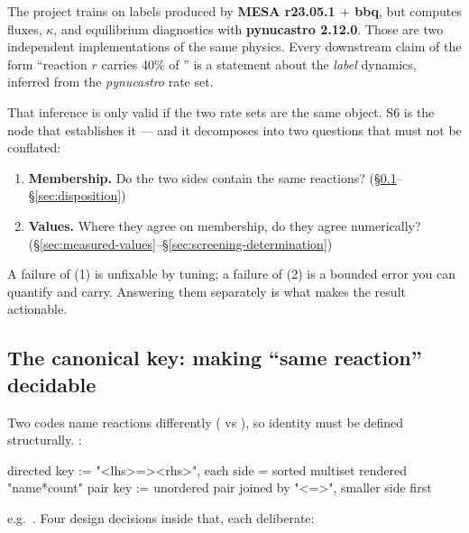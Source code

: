 The project trains on labels produced by \textbf{MESA r23.05.1 $+$ bbq}, but
computes fluxes, $\kappa$, and equilibrium diagnostics with \textbf{pynucastro
2.12.0}. Those are two independent implementations of the same physics. Every
downstream claim of the form ``reaction $r$ carries 40\% of \dYe'' is a
statement about the \emph{label} dynamics, inferred from the \emph{pynucastro}
rate set.

That inference is only valid if the two rate sets are the same object. S6 is the
node that establishes it --- and it decomposes into two questions that must not
be conflated:

\begin{enumerate}
\item \textbf{Membership.} Do the two sides contain the same reactions?
      (\S\ref{sec:canonicalkey}--\S\ref{sec:disposition})
\item \textbf{Values.} Where they agree on membership, do they agree
      numerically? (\S\ref{sec:measured-values}--\S\ref{sec:screening-determination})
\end{enumerate}

A failure of (1) is unfixable by tuning; a failure of (2) is a bounded error you
can quantify and carry. Answering them separately is what makes the result
actionable.

\subsection{The canonical key: making ``same reaction'' decidable}
\label{sec:canonicalkey}

Two codes name reactions differently ( vs
), so identity must be defined structurally.
:

\begin{srclisting}
directed key := "<lhs>=><rhs>",  each side = sorted multiset rendered "name*count"
pair key     := unordered pair joined by "<=>", smaller side first
\end{srclisting}

e.g.\ . Four design decisions inside that, each
deliberate:

